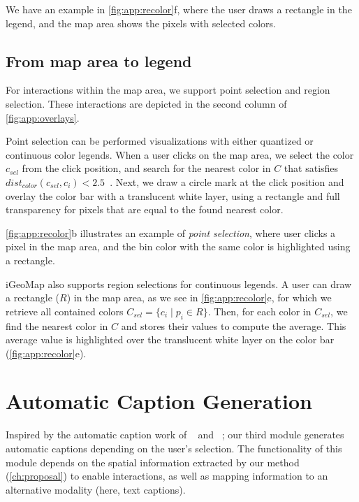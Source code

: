 We have an example in \autoref{fig:app:recolor}f, where the user draws a rectangle in the legend, and the map area shows the pixels with selected colors.


\subsection*{From map area to legend}
For interactions within the map area, we support point selection and region selection. These interactions are depicted in the second column of \autoref{fig:app:overlays}.

Point selection can be performed visualizations with either quantized or continuous color legends.
%
When a user clicks on the map area, we select the color $c_{sel}$ from the click position, and search for the nearest color in $C$ that satisfies $dist_{color}(c_{sel}, c_i) < 2.5$~\citep{Stokes1992}. Next, we draw a circle mark at the click position and overlay the color bar with a translucent white layer, using a rectangle and full transparency for pixels that are equal to the found nearest color.

\autoref{fig:app:recolor}b illustrates an example of \textit{point selection}, where user clicks a pixel in the map area, and the bin color with the same color is highlighted using a rectangle.


iGeoMap also supports region selections for continuous legends. A user can draw a rectangle ($R$) in the map area, as we see in \autoref{fig:app:recolor}e, for which we retrieve all contained colors $C_{sel}=\{c_i\;|\;p_i \in R\}$. Then, for each color in $C_{sel}$, we find the nearest color in $C$ and stores their values to compute the average. This average value is highlighted over the translucent white layer on the color bar (\autoref{fig:app:recolor}e).



\section{Automatic Caption Generation}
\label{sec:app_captionGen}
Inspired by the automatic caption work of \citeauthor{Demir2008}~\citep{Demir2008} and \citeauthor{Greenbacker2011}~\citep{Greenbacker2011}; our third module generates automatic captions depending on the user's selection. The functionality of this module depends on the spatial information extracted by our method (\autoref{ch:proposal}) to enable interactions, as well as mapping information to an alternative modality (here, text captions).

